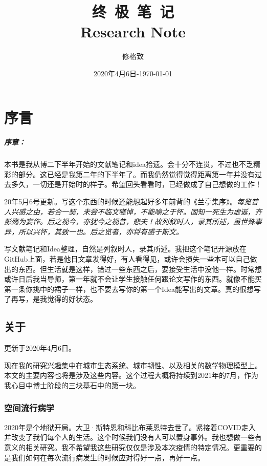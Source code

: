 \documentclass[letterpaper,twocolumn,10pt]{book}
\title{\Huge{\textbf{终\ 极\ 笔\ 记}} \\ \vspace{0.5cm} \huge{Research Note}}
\author{修格致}
\date{2020年4月6日-\today}
\begin{document}
\frontmatter

\maketitle

\tableofcontents

\mainmatter

\chapter{序言}

\paragraph{序章：} 本书是我从博二下半年开始的文献笔记和idea拾遗。会十分不连贯，不过也不乏精彩的部分。这已经是我第二年的下半年了。而我仍然觉得觉得距离第一年并没有过去多久，一切还是开始时的样子。希望回头看看时，已经做成了自己想做的工作！

20年5月6号更新。写这个东西的时候还能想起好多年前背的《兰亭集序》。\textit{每览昔人兴感之由，若合一契，未尝不临文嗟悼，不能喻之于怀。固知一死生为虚诞，齐彭殇为妄作。后之视今，亦犹今之视昔，悲夫！故列叙时人，录其所述，虽世殊事异，所以兴怀，其致一也。后之览者，亦将有感于斯文。}

写文献笔记和Idea整理，自然是列叙时人，录其所述。我把这个笔记开源放在GitHub上面，若是他日文章发得好，有人看得见，或许会损失一些本可以自己做出的东西。但生活就是这样，错过一些东西之后，要接受生活中没他一样。时常想或许日后我当导师，第一年就不会让学生接触任何跟论文写作的东西。就像不能买第一条你挑中的裙子一样，也不要去写你的第一个Idea能写出的文章。真的很想写了再写，是我觉得的好状态。


\section{关于}
\textcolor[rgb]{0,0,1}{更新于2020年4月6日。}

现在我的研究兴趣集中在城市生态系统、城市韧性、以及相关的数学物理模型上。本文的主要内容也将是涉及这些内容。这个过程大概将持续到2021年的7月，作为我心目中博士阶段的三块基石中的第一块。

\subsection{空间流行病学}
2020年是个地狱开局。大卫·斯特恩和科比布莱恩特去世了。紧接着COVID走入并改变了我们每个人的生活。这个时候我们没有人可以置身事外。我也想做一些有意义的相关研究。我不希望我这些研究仅仅是涉及本次疫情的特定情况。更重要的是我们如何在每次流行病发生的时候应对得好一点，再好一点。
\end{document}
